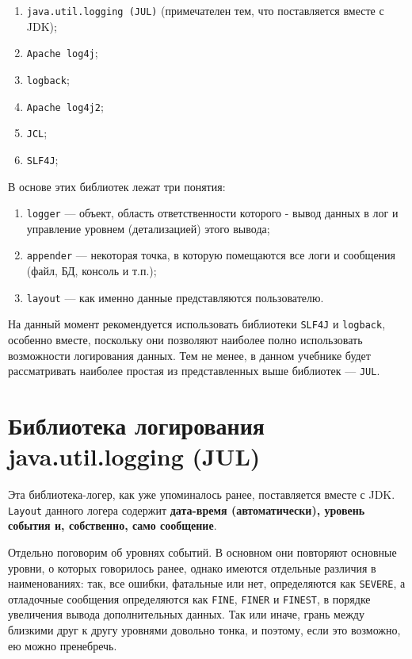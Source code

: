 \begin{enumerate}
    \item \verb|java.util.logging (JUL)| (примечателен тем, что поставляется вместе с JDK);
    \item \verb|Apache log4j|;
    \item \verb|logback|;
    \item \verb|Apache log4j2|;
    \item \verb|JCL|;
    \item \verb|SLF4J|;
\end{enumerate}

В основе этих библиотек лежат три понятия:

\begin{enumerate}
    \item \verb|logger| — объект, область ответственности которого - вывод данных в лог и управление уровнем (детализацией) этого вывода;
    \item \verb|appender| — некоторая точка, в которую помещаются все логи и сообщения (файл, БД, консоль и т.п.);
    \item \verb|layout| — как именно данные представляются пользователю.
\end{enumerate}

На данный момент рекомендуется использовать библиотеки \verb|SLF4J| и \verb|logback|, особенно вместе, поскольку они позволяют наиболее полно использовать возможности логирования данных. Тем не менее, в данном учебнике будет рассматривать наиболее простая из представленных выше библиотек — \verb|JUL|.

\section{Библиотека логирования java.util.logging (JUL)}

Эта библиотека-логер, как уже упоминалось ранее, поставляется вместе с JDK. \verb|Layout| данного логера содержит \textbf{дата-время (автоматически), уровень события и, собственно, само сообщение}.

Отдельно поговорим об уровнях событий. В основном они повторяют основные уровни, о которых говорилось ранее, однако имеются отдельные различия в наименованиях: так, все ошибки, фатальные или нет, определяются как \verb|SEVERE|, а отладочные сообщения определяются как \verb|FINE|, \verb|FINER| и \verb|FINEST|, в порядке увеличения вывода дополнительных данных. Так или иначе, грань между близкими друг к другу уровнями довольно тонка, и поэтому, если это возможно, ею можно пренебречь.

